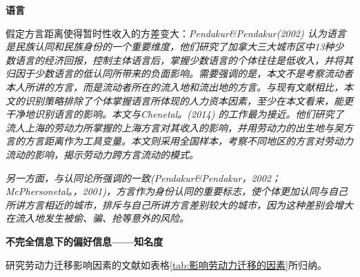 \documentclass[a4paper,12pt,oneside]{book} %
\begin{document}
\textbf{语言}

\cite{LiuYuYunLaoDongLiKuaFangYanLiuDongDeDaoUXingMoShi2015}假定方言距离使得暂时性收入的方差变大：\textit{Pendakur\&Pendakur(2002) 认为语言是民族认同和民族身份的一个重要维度，他们研究了加拿大三大城市区中13种少数语言的经济回报，控制主体语言后，掌握少数语言的个体往往是低收入，并将其归因于少数语言的低认同所带来的负面影响。需要强调的是，本文不是考察流动者本人所讲的方言，而是流动者所在的流入地和流出地的方言。与现有文献相比，本文的识别策略排除了个体掌握语言所体现的人力资本因素，至少在本文看来，能更干净地识别语言的影响。本文与Chenetal。(2014) 的工作最为接近。他们研究了流人上海的劳动力所掌握的上海方言对其收入的影响，并用劳动力的出生地与吴方言的方言距离作为工具变量。本文则采用全国样本，考察不同地区的方言对劳动力流动的影响，揭示劳动力跨方言流动的模式。}

\textit{另一方面，与认同论所强调的一致(Pendakur\&Pendakur，2002；McPhersonetal。，2001)，方言作为身份认同的重要标志，使个体更加认同与自己所讲方言相近的城市，排斥与自己所讲方言差别较大的城市，因为这种差别会增大在流入地发生被偷、骗、抢等意外的风险。}





\textbf{不完全信息下的偏好信息——知名度}






研究劳动力迁移影响因素的文献如表格\ref{tab:影响劳动力迁移的因素}所归纳。
\end{document}

